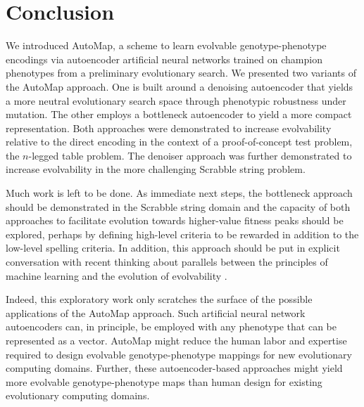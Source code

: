 \section{Conclusion} \label{sec:conclusion}

We introduced AutoMap, a scheme to learn evolvable genotype-phenotype encodings via autoencoder artificial neural networks trained on champion phenotypes from a preliminary evolutionary search.
We presented two variants of the AutoMap approach.
One is built around a denoising autoencoder that yields a more neutral evolutionary search space through phenotypic robustness under mutation.
The other employs a bottleneck autoencoder to yield a more compact representation.
Both approaches were demonstrated to increase evolvability relative to the direct encoding in the context of a proof-of-concept test problem, the $n$-legged table problem.
The denoiser approach was further demonstrated to increase evolvability in the more challenging Scrabble string problem.

Much work is left to be done.
As immediate next steps, the bottleneck approach should be demonstrated in the Scrabble string domain and the capacity of both approaches to facilitate evolution towards higher-value fitness peaks should be explored, perhaps by defining high-level criteria to be rewarded in addition to the low-level spelling criteria.
In addition, this approach should be put in explicit conversation with recent thinking about parallels between the principles of machine learning and the evolution of evolvability \cite{kouvaris2017evolution, watson2016can}.

Indeed, this exploratory work only scratches the surface of the possible applications of the AutoMap approach.
Such artificial neural network autoencoders can, in principle, be employed with any phenotype that can be represented as a vector.
AutoMap might reduce the human labor and expertise required to design evolvable genotype-phenotype mappings for new evolutionary computing domains.
Further, these autoencoder-based approaches might yield more evolvable genotype-phenotype maps than human design for existing evolutionary computing domains.

